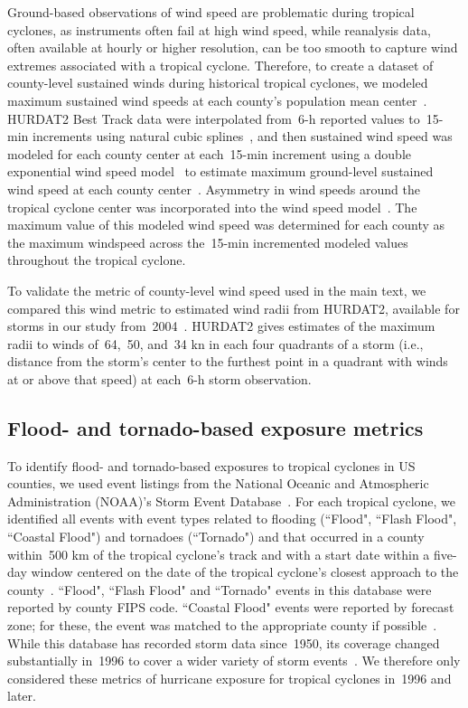 Ground-based observations of wind speed are problematic during tropical
cyclones, as instruments often fail at high wind speed, while reanalysis data,
often available at hourly or higher resolution, can be too smooth to capture
wind extremes associated with a tropical cyclone. Therefore, to create a
dataset of county-level sustained winds during historical tropical cyclones, we
modeled maximum sustained wind speeds at each county's population mean
center~\parencite{countycenters}. \ac{HURDAT2} Best Track data were interpolated
from~6-\si{\hour} reported values to~15-\si{\minute} increments using natural cubic
splines~\parencite{stormwindmodel}, and then sustained wind speed was modeled for
each county center at each~15-\si{\minute} increment using a double exponential wind
speed model~\parencite{willoughby2006parametric} to estimate maximum ground-level
sustained wind speed at each county center~\parencite{stormwindmodel}. Asymmetry in
wind speeds around the tropical cyclone center was incorporated into the wind
speed model~\parencite{phadke2003modeling, stormwindmodel}. The maximum value of
this modeled wind speed was determined for each county as the maximum windspeed
across the~15-\si{\minute} incremented modeled values throughout the tropical
cyclone.

To validate the metric of county-level wind speed used in the main text, we
compared this wind metric to estimated wind radii from \ac{HURDAT2}, available
for storms in our study from~2004~\parencite{landsea2013}. \ac{HURDAT2} gives
estimates of the maximum radii to winds of~64,~50, and~34 \si{\knot} in each four
quadrants of a storm (i.e., distance from the storm's center to the furthest
point in a quadrant with winds at or above that speed) at each~6-\si{\hour} storm
observation. 

\subsection*{Flood- and tornado-based exposure metrics}

To identify flood- and tornado-based exposures to tropical cyclones in \ac{US}
counties, we used event listings from the National Oceanic and Atmospheric
Administration (NOAA)'s Storm Event Database~\parencite{stormevents}. For each
tropical cyclone, we identified all events with event types related to flooding
(``Flood", ``Flash Flood", ``Coastal Flood") and tornadoes (``Tornado") and
that occurred in a county within~500 \si{\kilo\metre} of the tropical cyclone's track
and with a start date within a five-day window centered on the date of the
tropical cyclone's closest approach to the
county~\parencite{hurricaneexposuredata}. ``Flood", ``Flash Flood" and ``Tornado"
events in this database were reported by county \ac{FIPS} code. ``Coastal
Flood" events were reported by forecast zone; for these, the event was matched
to the appropriate county if possible~\parencite{noaastormevents}. While this
database has recorded storm data since~1950, its coverage changed substantially
in~1996 to cover a wider variety of storm events~\parencite{stormevents}. We
therefore only considered these metrics of hurricane exposure for tropical
cyclones in~1996 and later.

